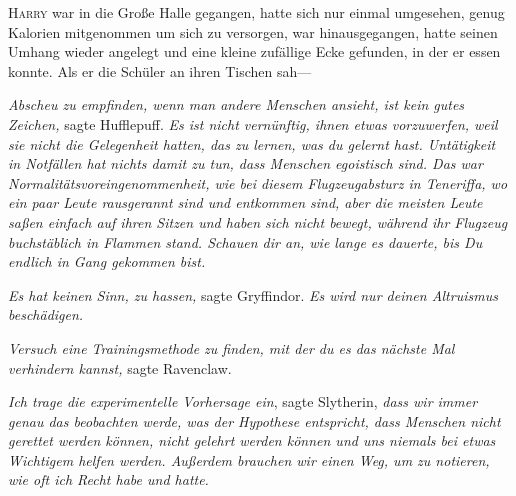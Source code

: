 

\lettrine{H}{arry} war in die Große Halle gegangen, hatte sich nur einmal umgesehen, genug Kalorien mitgenommen um sich zu versorgen, war hinausgegangen, hatte seinen Umhang wieder angelegt und eine kleine zufällige Ecke gefunden, in der er essen konnte. Als er die Schüler an ihren Tischen sah—

\emph{Abscheu zu empfinden, wenn man andere Menschen ansieht, ist kein gutes Zeichen,} sagte Hufflepuff. \emph{Es ist nicht vernünftig, ihnen etwas vorzuwerfen, weil sie nicht die Gelegenheit hatten, das zu lernen, was du gelernt hast. Untätigkeit in Notfällen hat nichts damit zu tun, dass Menschen egoistisch sind. Das war Normalitätsvoreingenommenheit, wie bei diesem Flugzeugabsturz in Teneriffa, wo ein paar Leute rausgerannt sind und entkommen sind, aber die meisten Leute saßen einfach auf ihren Sitzen und haben sich nicht bewegt, während ihr Flugzeug buchstäblich in Flammen stand. Schauen dir an, wie lange es dauerte, bis \emph{Du} endlich in Gang gekommen bist.}

\emph{Es hat keinen Sinn, zu hassen,} sagte Gryffindor. \emph{Es wird nur deinen Altruismus beschädigen.}

\emph{Versuch eine Trainingsmethode zu finden, mit der du es das nächste Mal verhindern kannst,} sagte Ravenclaw.

\emph{Ich trage die experimentelle Vorhersage ein}, sagte Slytherin, \emph{dass wir immer genau das beobachten werde, was der Hypothese entspricht, dass Menschen nicht gerettet werden können, nicht gelehrt werden können und uns niemals bei etwas Wichtigem helfen werden. Außerdem brauchen wir einen Weg, um zu notieren, wie oft ich Recht habe und hatte.}

